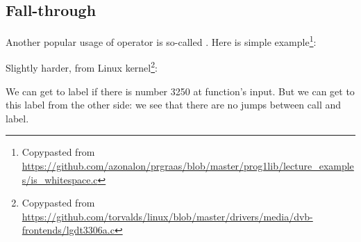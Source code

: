 ﻿\subsection{Fall-through}

Another popular usage of  operator is so-called .
Here is simple example\footnote{Copypasted from \url{https://github.com/azonalon/prgraas/blob/master/prog1lib/lecture_examples/is_whitespace.c}}:



Slightly harder, from Linux kernel\footnote{Copypasted from \url{https://github.com/torvalds/linux/blob/master/drivers/media/dvb-frontends/lgdt3306a.c}}:





We can get to  label if there is number 3250 at function's input.
But we can get to this label from the other side:
we see that there are no jumps between \printf call and  label.

